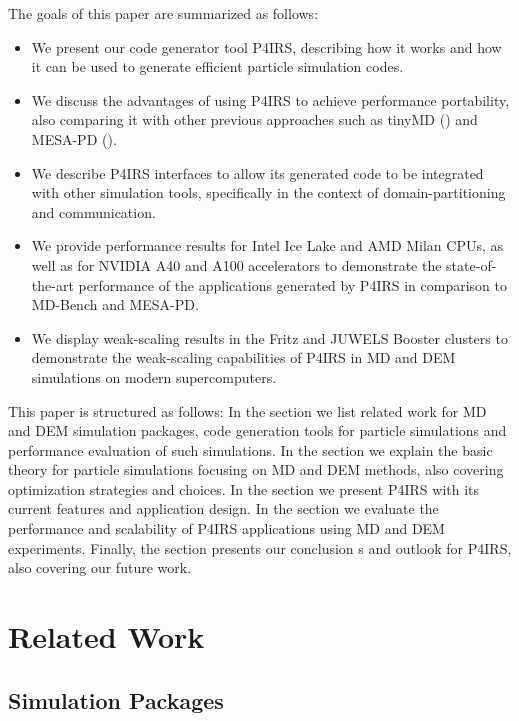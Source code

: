 \documentclass[Afour,sageh,times]{sagej}
\newcommand{\RMchange}[1]{{\color{blue} #1}}
\begin{document}
The goals of this paper are summarized as follows:
\begin{itemize}
    \item We present our code generator tool P4IRS, describing how it works and how it can be used to generate efficient particle simulation codes.
    \item We discuss the advantages of using P4IRS to achieve performance portability, also comparing it with other previous approaches such as tinyMD (\cite{tinymd}) and MESA-PD (\cite{mesapd1,mesapd2}).
    \item We describe P4IRS interfaces to allow its generated code to be integrated with other simulation tools, specifically in the context of domain-partitioning and communication.
    \item We provide performance results for Intel Ice Lake and AMD Milan CPUs, as well as for NVIDIA A40 and A100 accelerators to demonstrate the state-of-the-art performance of the applications generated by P4IRS in comparison to MD-Bench and MESA-PD.
    \item We display weak-scaling results in the Fritz and JUWELS Booster clusters to demonstrate the weak-scaling capabilities of P4IRS in MD and DEM simulations on modern supercomputers.
\end{itemize}

This paper is structured as follows: In the  section we list related work for MD and DEM simulation packages, code generation tools for particle simulations and performance evaluation of such simulations.
In the  section we explain the basic theory for particle simulations focusing on MD and DEM methods, also covering optimization strategies and choices.
In the  section we present P4IRS with its current features and application design.
In the  section we evaluate the performance and scalability \RMchange{of} P4IRS applications using \ac{MD} and \ac{DEM} experiments.
Finally, the  section presents our conclusion\RMchange{s} and outlook for P4IRS, also covering our future work.

\section{Related Work}
\label{sec:related_work}

\subsection{Simulation Packages}
\label{sec:packages}
\end{document}
